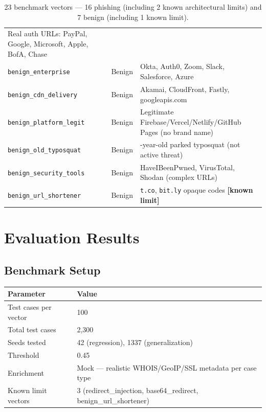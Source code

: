 \documentclass[11pt,a4paper]{article}
\newcommand{\code}[1]{\texttt{#1}}
\begin{document}
\begin{table}[h]
\begin{tabularx}{\textwidth}{>{\raggedright}p{4.0cm}
                              >{\raggedright}p{1.5cm}
                              >{\raggedright\arraybackslash}X}
  Real auth URLs: PayPal, Google, Microsoft, Apple, BofA, Chase \\
\code{benign\_enterprise}   & Benign &
  Okta, Auth0, Zoom, Slack, Salesforce, Azure \\
\code{benign\_cdn\_delivery} & Benign &
  Akamai, CloudFront, Fastly, googleapis.com \\
\code{benign\_platform\_legit} & Benign &
  Legitimate Firebase/Vercel/Netlify/GitHub Pages (no brand name) \\
\code{benign\_old\_typosquat} & Benign &
  24-year-old parked typosquat (not active threat) \\
\code{benign\_security\_tools} & Benign &
  HaveIBeenPwned, VirusTotal, Shodan (complex URLs) \\
\code{benign\_url\_shortener} & Benign &
  \code{t.co}, \code{bit.ly} opaque codes \textbf{[known limit]} \\
\bottomrule
\end{tabularx}
\caption*{23 benchmark vectors --- 16 phishing (including 2 known
architectural limits) and 7 benign (including 1 known limit).}
\end{table}

\section{Evaluation Results}

\subsection{Benchmark Setup}

\begin{table}[h]
\centering
\begin{tabular}{ll}
\toprule
Parameter & Value \\
\midrule
Test cases per vector & 100 \\
Total test cases & 2,300 \\
Seeds tested & 42 (regression), 1337 (generalization) \\
Threshold & 0.45 \\
Enrichment & Mock --- realistic WHOIS/GeoIP/SSL metadata per case type \\
Known limit vectors & 3 (redirect\_injection, base64\_redirect,
                        benign\_url\_shortener) \\
\bottomrule
\end{tabular}
\end{table}
\end{document}

